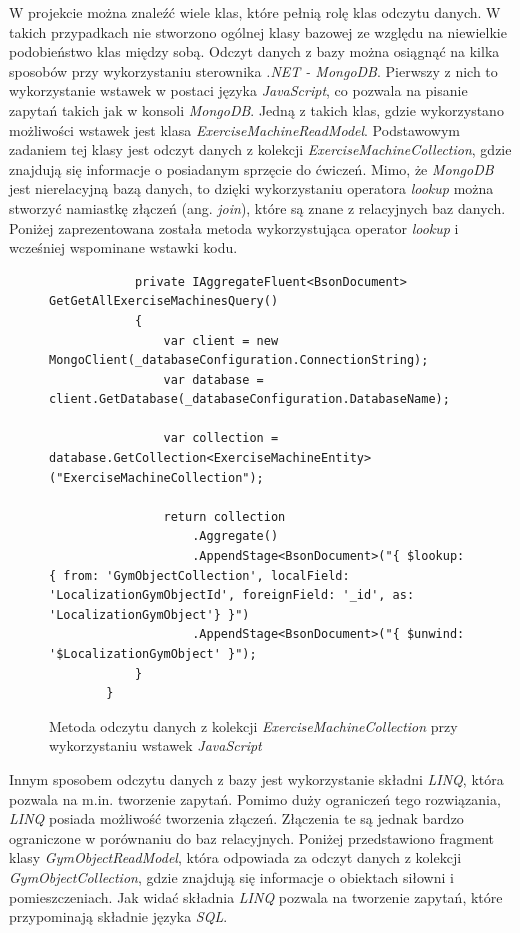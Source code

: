 \documentclass[a4paper,twoside,12pt]{book}
\newcommand{\obcy}[1]{\emph{#1}}
\newcommand{\ang}[1]{{\selectlanguage{british}\obcy{#1}}}
\begin{document}
W projekcie można znaleźć wiele klas, które pełnią rolę klas odczytu danych. W takich przypadkach nie stworzono ogólnej klasy bazowej ze względu na niewielkie podobieństwo klas między sobą. Odczyt danych z bazy można osiągnąć na kilka sposobów przy wykorzystaniu sterownika \textit{.NET - MongoDB}. Pierwszy z nich to wykorzystanie wstawek w postaci języka \textit{JavaScript}, co pozwala na pisanie zapytań takich jak w konsoli \textit{MongoDB}. Jedną z takich klas, gdzie wykorzystano możliwości wstawek jest klasa \textit{ExerciseMachineReadModel}. Podstawowym zadaniem tej klasy jest odczyt danych z kolekcji \textit{ExerciseMachineCollection}, gdzie znajdują się informacje o posiadanym sprzęcie do ćwiczeń. Mimo, że \textit{MongoDB} jest nierelacyjną bazą danych, to dzięki wykorzystaniu operatora \textit{lookup} można stworzyć namiastkę złączeń (ang. \ang{join}), które są znane z relacyjnych baz danych. Poniżej zaprezentowana została metoda wykorzystująca operator \textit{lookup} i wcześniej wspominane wstawki kodu.
\begin{figure} [H]
	\centering
	\begin{lstlisting}			
			private IAggregateFluent<BsonDocument> GetGetAllExerciseMachinesQuery()
			{
				var client = new MongoClient(_databaseConfiguration.ConnectionString);
				var database = client.GetDatabase(_databaseConfiguration.DatabaseName);
				
				var collection = database.GetCollection<ExerciseMachineEntity>("ExerciseMachineCollection");
				
				return collection
					.Aggregate()
					.AppendStage<BsonDocument>("{ $lookup: { from: 'GymObjectCollection', localField: 'LocalizationGymObjectId', foreignField: '_id', as: 'LocalizationGymObject'} }")
					.AppendStage<BsonDocument>("{ $unwind: '$LocalizationGymObject' }");
			}
		}
	\end{lstlisting}
	\caption{Metoda odczytu danych z kolekcji \textit{ExerciseMachineCollection} przy wykorzystaniu wstawek \textit{JavaScript}}
	\label{fig:exerciseMachineReadModel}
\end{figure}
Innym sposobem odczytu danych z bazy jest wykorzystanie składni \textit{LINQ}, która pozwala na m.in. tworzenie zapytań. Pomimo duży ograniczeń tego rozwiązania, \textit{LINQ} posiada możliwość tworzenia złączeń. Złączenia te są jednak bardzo ograniczone w porównaniu do baz relacyjnych. Poniżej przedstawiono fragment klasy \textit{GymObjectReadModel}, która odpowiada za odczyt danych z kolekcji \textit{GymObjectCollection}, gdzie znajdują się informacje o obiektach siłowni i pomieszczeniach. Jak widać składnia \textit{LINQ} pozwala na tworzenie zapytań, które przypominają składnie języka \textit{SQL}.
\end{document}
